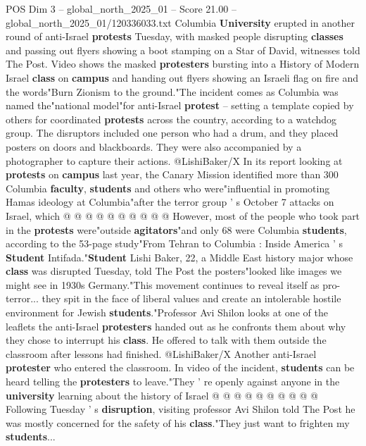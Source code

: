 \begin{textsample}{POS Dim 3 – global\_north\_2025\_01 – Score 21.00 – global\_north\_2025\_01/120336033.txt}  \label{ex:f3_pos_239}
Columbia \textbf{University} erupted in another round of anti-Israel \textbf{protests} Tuesday, with masked people disrupting \textbf{classes} and passing out flyers showing a boot stamping on a Star of David, witnesses told The Post.
Video shows the masked \textbf{protesters} bursting into a History of Modern Israel \textbf{class} on \textbf{campus} and handing out flyers showing an Israeli flag on fire and the words"Burn Zionism to the ground."The incident comes as Columbia was named the"national model"for anti-Israel \textbf{protest} -- setting a template copied by others for coordinated \textbf{protests} across the country, according to a watchdog group.
The disruptors included one person who had a drum, and they placed posters on doors and blackboards.
They were also accompanied by a photographer to capture their actions. @LishiBaker/X In its report looking at \textbf{protests} on \textbf{campus} last year, the Canary Mission identified more than 300 Columbia \textbf{faculty}, \textbf{students} and others who were"influential in promoting Hamas ideology at Columbia"after the terror group ' s October 7 attacks on Israel, which @ @ @ @ @ @ @ @ @ @ However, most of the people who took part in the \textbf{protests} were"outside \textbf{agitators}"and only 68 were Columbia \textbf{students}, according to the 53-page study"From Tehran to Columbia : Inside America ' s \textbf{Student} Intifada."\textbf{Student} Lishi Baker, 22, a Middle East history major whose \textbf{class} was disrupted Tuesday, told The Post the posters"looked like images we might see in 1930s Germany."This movement continues to reveal itself as pro-terror... they spit in the face of liberal values and create an intolerable hostile environment for Jewish \textbf{students}."Professor Avi Shilon looks at one of the leaflets the anti-Israel \textbf{protesters} handed out as he confronts them about why they chose to interrupt his \textbf{class}.
He offered to talk with them outside the classroom after lessons had finished. @LishiBaker/X Another anti-Israel \textbf{protester} who entered the classroom.
In video of the incident, \textbf{students} can be heard telling the \textbf{protesters} to leave."They ' re openly against anyone in the \textbf{university} learning about the history of Israel @ @ @ @ @ @ @ @ @ @ Following Tuesday ' s \textbf{disruption}, visiting professor Avi Shilon told The Post he was mostly concerned for the safety of his \textbf{class}."They just want to frighten my \textbf{students}...

\end{textsample}
